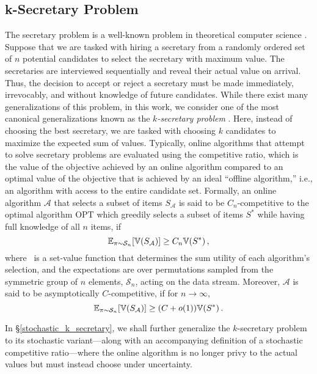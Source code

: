 \subsection{k-Secretary Problem}
The secretary problem is a well-known problem in theoretical computer science \cite{dynkin1963optimum,ferguson1989solved}. Suppose that we are tasked with hiring a secretary from a randomly ordered set of $n$ potential candidates to select the secretary with maximum value. The secretaries are interviewed sequentially and reveal their actual value on arrival. Thus, the decision to accept or reject a secretary must be made immediately, irrevocably, and without knowledge of future candidates. While there exist many generalizations of this problem, in this work, we consider one of the most canonical generalizations known as the \textit{$k$-secretary problem} \cite{kleinberg2005multiple}. Here, instead of choosing the best secretary, we are tasked with choosing $k$ candidates to maximize the expected sum of values. Typically, online algorithms that attempt to solve secretary problems are evaluated using the competitive ratio, which is the value of the objective achieved by an online algorithm compared to an optimal value of the objective that is achieved by an ideal ``offline algorithm,” i.e., an algorithm with access to the entire candidate set. Formally, an online algorithm $\mathcal{A}$ that selects a subset of items $S_{\mathcal{A}}$  is said to be $C_n$-competitive to the optimal algorithm $\textrm{OPT}$ which greedily selects a subset of items $S^*$ while having full knowledge of all $n$ items, if 
\begin{equation}
    \mathbb{E}_{\pi\sim \mathcal{S}_n}[\mathbb{V}(S_{\mathcal{A}})] \geq  C_n  \mathbb{V}(S^*) \,,
    \label{eq:comp_ration}
\end{equation}
where \setvalue\ is a set-value function that determines the sum utility of each algorithm's selection, and the expectations are over permutations sampled from the symmetric group of $n$ elements, $\mathcal{S}_n$, acting on the data stream.
Moreover, $\mathcal{A}$ is said to be asymptotically $C$-competitive, if for $n \to \infty$,
\begin{equation*}
    \mathbb{E}_{\pi\sim \mathcal{S}_n}[\mathbb{V}(S_{\mathcal{A}})] \geq  (C + o(1)) \mathbb{V}(S^*) \,.
    \label{eq:asym_omp_ration}
\end{equation*}

In \S\ref{stochastic_k_secretary}, we shall further generalize the $k$-secretary problem to its stochastic variant---along with an accompanying definition of a stochastic competitive ratio---where the online algorithm is no longer privy to the actual values but must instead choose under uncertainty.


